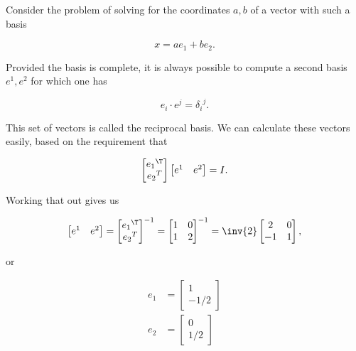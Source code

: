 \documentclass[iop,tighten]{emulateapj}
\begin{document}
Consider the problem of solving for the coordinates $a,b$ of a vector with such a basis

\begin{equation}\label{eqn:grahamSchmidtLorentz:110}
x = a e_1 + b e_2.
\end{equation}

Provided the basis is complete, it is always possible to compute a second basis ${e^1, e^2}$ for which one has

\begin{equation}\label{eqn:grahamSchmidtLorentz:130}
e_i \cdot e^j = {\delta_i}^j.
\end{equation}

This set of vectors is called the reciprocal basis.  We can calculate these vectors easily, based on the requirement that

\begin{equation}\label{eqn:grahamSchmidtLorentz:150}
\begin{bmatrix}
{e_1}^\T \\
{e_2}^T
\end{bmatrix}
\begin{bmatrix}
e^1 & e^2
\end{bmatrix} = I.
\end{equation}

Working that out gives us

\begin{equation}\label{eqn:grahamSchmidtLorentz:170}
\begin{bmatrix}
e^1 & e^2
\end{bmatrix}
=
{
\begin{bmatrix}
{e_1}^\T \\
{e_2}^T
\end{bmatrix}
}^{-1}
= 
{\begin{bmatrix}
1 & 0 \\
1 & 2
\end{bmatrix}}^{-1}
= 
\inv{2} 
\begin{bmatrix}
2 & 0 \\
-1 & 1
\end{bmatrix},
\end{equation}

or

\begin{equation}\label{eqn:grahamSchmidtLorentz:190}
\begin{aligned}
e_1 &= 
\begin{bmatrix}
1 \\
-1/2
\end{bmatrix} \\
e_2 &= 
\begin{bmatrix}
0 \\
1/2
\end{bmatrix} 
\end{aligned}
\end{equation}
\end{document}
